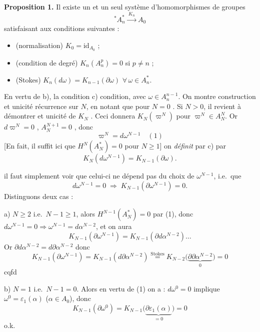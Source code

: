 \documentclass[11pt,a4paper]{article}
\begin{document}
\textbf{Proposition 1.} Il existe un et un seul système d'homomorphismes de groupes
\[
  {}^{*}A_n^{*} \xrightarrow{\ K_n\ } A_0
\]
satisfaisant aux conditions suivantes :
\begin{itemize}
  \item[a)] (normalisation) \quad $K_0 = \mathrm{id}_{A_0}$ ;
  \item[b)] (condition de degré) \quad $K_n(A_n^{p}) = 0$ si $p \neq n$ ;
  \item[c)] (Stokes) \quad $K_n(d\omega) = K_{n-1}(\partial\omega)$ \quad $\forall\, \omega \in A_n^{*}$.
\end{itemize}


En vertu de b), la condition c)  \ill{} \ill{} condition, avec
$\omega \in A_n^{n-1}$. On montre construction et unicité 
\ill{} récurrence sur $N$, en notant que pour $N = 0$ . Si $N > 0$,
 il revient à démontrer  et unicité de $K_N$ \ill{}.
Ceci donnera $K_N(\varpi^{N})$ pour $\varpi^{N} \in A_N^{N}$.
Or $d\varpi^{N} = 0$ \struck{\ill{}},  $A_N^{N+1} = 0$ , donc
\[
  \varpi^{N} = d\omega^{N-1} \quad (1)
\]
[En fait, il suffit ici que $H^{N}(A_N^{*}) = 0$ pour $N \geq 1$] on  
\emph{définit} par c) par
\[
  K_N(d\omega^{N-1}) = K_{N-1}(\partial\omega) .
\]

il faut simplement voir que celui-ci ne dépend pas du choix de $\omega^{N-1}$, i.e.\ que
\[
  d\omega^{N-1} = 0 \;\Longrightarrow\; K_{N-1}(\partial\omega^{N-1}) = 0 .
\]
Distinguons deux cas :

a) $N \geq 2$ i.e.\ $N - 1 \geq 1$, alors $H^{N-1}(A_N^{*}) = 0$ par (1), donc
$d\omega^{N-1} = 0 \Rightarrow \omega^{N-1} = d\alpha^{N-2}$, et on aura
\[
  K_{N-1}(\partial\omega^{N-1}) = K_{N-1}(\partial d\alpha^{N-2})\ldots
\]
Or  $\partial d\alpha^{N-2} = d\partial\alpha^{N-2}$ donc \ill{}
\[
  K_{N-1}(\partial\omega^{N-1}) = K_{N-1}(d\partial\alpha^{N-2})
  \overset{\text{Stokes}}{=} K_{N-2}\bigl(\underbrace{\partial\partial\alpha^{N-2}}_{0}\bigr) = 0
\]
cqfd

b) $N = 1$ i.e.\ $N - 1 = 0$. Alors en vertu de (1) on a :
$d\omega^{0} = 0$ implique $\omega^{0} = \varepsilon_1(\alpha)$ ($\alpha \in A_0$), donc
\[
  K_{N-1}(\partial\omega^{0}) = K_{N-1}\bigl(\underbrace{\partial\varepsilon_1(\alpha)}_{=0}\bigr) = 0
\]
 o.k.
\end{document}
